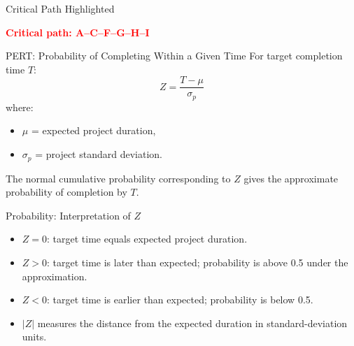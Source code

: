 \documentclass[aspectratio=169,10pt]{beamer}
\newcommand{\criticaltext}[1]{\begin{center}\parbox{0.78\textwidth}{\centering\textcolor{Red}{\textbf{#1}}}\end{center}}
\begin{document}
\begin{frame}{Critical Path Highlighted}
\centering
{}
\vspace{0.15cm}
\criticaltext{Critical path: A--C--F--G--H--I}
\end{frame}

\begin{frame}{PERT: Probability of Completing Within a Given Time}
For target completion time $T$:
\[
\boxed{Z=\frac{T-\mu}{\sigma_p}}
\]
where:
\begin{itemize}
  \item $\mu$ = expected project duration,
  \item $\sigma_p$ = project standard deviation.
\end{itemize}
The normal cumulative probability corresponding to $Z$ gives the approximate probability of completion by $T$.
\end{frame}

\begin{frame}{Probability: Interpretation of $Z$}
\begin{itemize}
  \item $Z=0$: target time equals expected project duration.
  \item $Z>0$: target time is later than expected; probability is above 0.5 under the approximation.
  \item $Z<0$: target time is earlier than expected; probability is below 0.5.
  \item $|Z|$ measures the distance from the expected duration in standard-deviation units.
\end{itemize}
\end{frame}
\end{document}
